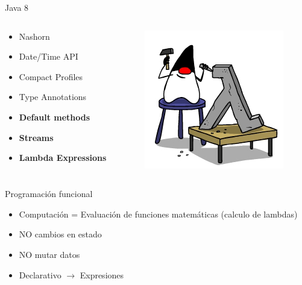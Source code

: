 \documentclass{beamer}
\begin{document}
\begin{frame}{Java 8}
     \begin{columns}[T] %
	     \begin{column}[T]{5cm} %
				\begin{itemize}
				\item Nashorn
				\item Date/Time API
				\item Compact Profiles
				\item Type Annotations
				\item \textbf{Default methods}
				\item \textbf{Streams}
				\item \textbf{Lambda Expressions}
				\end{itemize}
	     \end{column}
	     \begin{column}[T]{5cm} %
			\begin{figure}
			\centering
			\includegraphics[width=0.7\linewidth]{Images/JavaLam-1}
			\end{figure}

	     \end{column}
     \end{columns}
\end{frame}

\begin{frame}{Programación funcional}
	\begin{itemize}
	\item Computación = Evaluación de funciones matemáticas (calculo de lambdas)
	\item NO cambios en estado
	\item NO mutar datos
	\item Declarativo $\to$ Expresiones 
	\end{itemize}
\end{frame}
\end{document}
